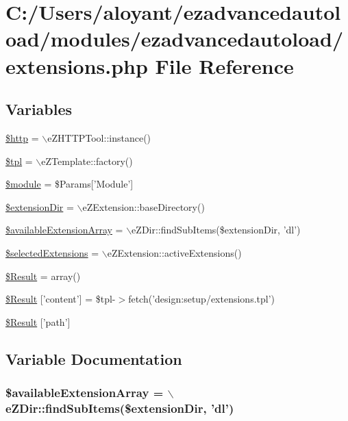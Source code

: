 \hypertarget{extensions_8php}{\section{C\-:/\-Users/aloyant/ezadvancedautoload/modules/ezadvancedautoload/extensions.php File Reference}
\label{extensions_8php}
}
\subsection*{Variables}
\begin{DoxyCompactItemize}
\item 
\hyperlink{extensions_8php_a775fc1707a7fa92aaa1c663c289dbbbc}{\$http} = $\backslash$e\-Z\-H\-T\-T\-P\-Tool\-::instance()
\item 
\hyperlink{extensions_8php_a04b1944cdb09f9a4e290cde7a12499e6}{\$tpl} = $\backslash$e\-Z\-Template\-::factory()
\item 
\hyperlink{extensions_8php_ac531301c55a8d8b6c7613597218ff482}{\$module} = \$Params\mbox{[}'Module'\mbox{]}
\item 
\hyperlink{extensions_8php_a511fe73f345235dca8dfab597f398521}{\$extension\-Dir} = $\backslash$e\-Z\-Extension\-::base\-Directory()
\item 
\hyperlink{extensions_8php_a6fef3e6ef57dbe6a39892b6de0cc7f5f}{\$available\-Extension\-Array} = $\backslash$e\-Z\-Dir\-::find\-Sub\-Items(\$extension\-Dir, 'dl')
\item 
\hyperlink{extensions_8php_adb784a735925c0ca3b600a1e0b1df50e}{\$selected\-Extensions} = $\backslash$e\-Z\-Extension\-::active\-Extensions()
\item 
\hyperlink{extensions_8php_a390d5702f3c15330fd764dbf08d5b2db}{\$\-Result} = array()
\item 
\hyperlink{extensions_8php_a0d32c70e3cf8c7b3fe5e4a499e9cd58f}{\$\-Result} \mbox{[}'content'\mbox{]} = \$tpl-\/$>$fetch('design\-:setup/extensions.\-tpl')
\item 
\hyperlink{extensions_8php_a94a2cc5784adee982dec0235638f6251}{\$\-Result} \mbox{[}'path'\mbox{]}
\end{DoxyCompactItemize}


\subsection{Variable Documentation}
\hypertarget{extensions_8php_a6fef3e6ef57dbe6a39892b6de0cc7f5f}{
\subsubsection[{\$available\-Extension\-Array}]{\setlength{\rightskip}{0pt plus 5cm}\$available\-Extension\-Array = $\backslash$e\-Z\-Dir\-::find\-Sub\-Items(\$extension\-Dir, 'dl')}}\label{extensions_8php_a6fef3e6ef57dbe6a39892b6de0cc7f5f}


